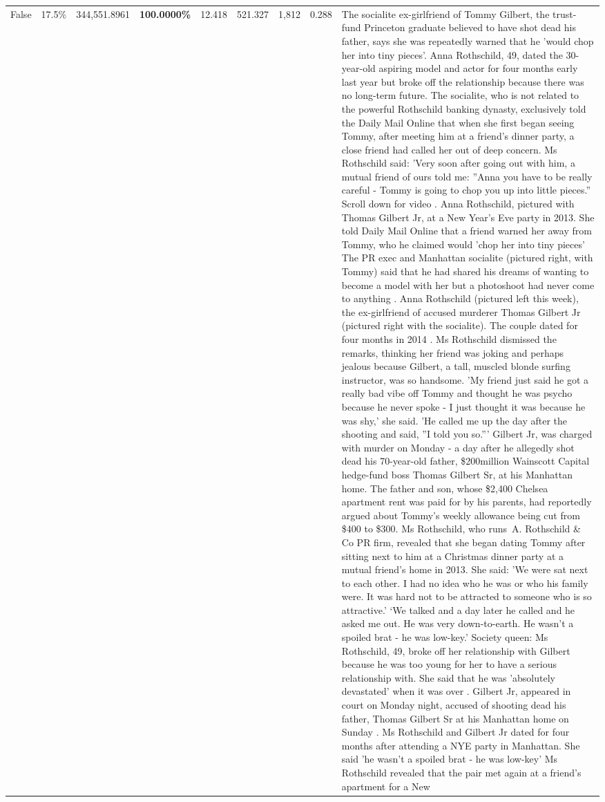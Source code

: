 \begin{table}[H]
\begin{tabular}{lllrlllll}
False & 17.5\% & 344,551.8961 & \bfseries \color{red} 100.0000\% & 12.418 & 521.327 & 1,812 & 0.288 & The socialite ex-girlfriend of Tommy Gilbert, the trust-fund Princeton graduate believed to have shot dead his father, says she was repeatedly warned that he 'would chop her into tiny pieces'. Anna Rothschild, 49, dated the 30-year-old aspiring model and actor for four months early last year but broke off the relationship because there was no long-term future. The socialite, who is not related to the powerful Rothschild banking dynasty, exclusively told the Daily Mail Online that when she first began seeing Tommy, after meeting him at a friend's dinner party, a close friend had called her out of deep concern. Ms Rothschild said: 'Very soon after going out with him, a mutual friend of ours told me: ''Anna you have to be really careful - Tommy is going to chop you up into little pieces.'' Scroll down for video . Anna Rothschild, pictured with Thomas Gilbert Jr, at a New Year's Eve party in 2013. She told Daily Mail Online that a friend warned her away from Tommy, who he claimed would 'chop her into tiny pieces' The PR exec and Manhattan socialite (pictured right, with Tommy) said that he had shared his dreams of wanting to become a model with her but a photoshoot had never come to anything . Anna Rothschild (pictured left this week), the ex-girlfriend of accused murderer Thomas Gilbert Jr (pictured right with the socialite). The couple dated for four months in 2014 . Ms Rothschild dismissed the remarks, thinking her friend was joking and perhaps jealous because Gilbert, a tall, muscled blonde surfing instructor, was so handsome. 'My friend just said he got a really bad vibe off Tommy and thought he was psycho because he never spoke - I just thought it was because he was shy,' she said. 'He called me up the day after the shooting and said, ''I told you so.''' Gilbert Jr, was charged with murder on Monday - a day after he allegedly shot dead his 70-year-old father, \$200million Wainscott Capital hedge-fund boss Thomas Gilbert Sr, at his Manhattan home. The father and son, whose \$2,400 Chelsea apartment rent was paid for by his parents, had reportedly argued about Tommy's weekly allowance being cut from \$400 to \$300. Ms Rothschild, who runs A. Rothschild \& Co PR firm, revealed that she began dating Tommy after sitting next to him at a Christmas dinner party at a mutual friend's home in 2013. She said: 'We were sat next to each other. I had no idea who he was or who his family were. It was hard not to be attracted to someone who is so attractive.' ‘We talked and a day later he called and he asked me out. He was very down-to-earth. He wasn’t a spoiled brat - he was low-key.’ Society queen: Ms Rothschild, 49, broke off her relationship with Gilbert because he was too young for her to have a serious relationship with. She said that he was 'absolutely devastated' when it was over . Gilbert Jr, appeared in court on Monday night, accused of shooting dead his father, Thomas Gilbert Sr at his Manhattan home on Sunday . Ms Rothschild and Gilbert Jr dated for four months after attending a NYE party in Manhattan. She said 'he wasn't a spoiled brat - he was low-key' Ms Rothschild revealed that the pair met again at a friend’s apartment for a New 
\end{tabular}
\end{table}
